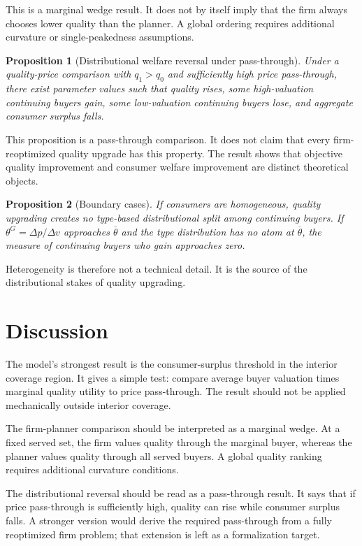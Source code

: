 \documentclass[12pt]{article}
\theoremstyle{plain}
\newtheorem{proposition}{Proposition}
\theoremstyle{definition}
\theoremstyle{remark}
\begin{document}
This is a marginal wedge result. It does not by itself imply that the firm always chooses lower quality than the planner. A global ordering requires additional curvature or single-peakedness assumptions.

\begin{proposition}[Distributional welfare reversal under pass-through]
Under a quality-price comparison with $q_1>q_0$ and sufficiently high price pass-through, there exist parameter values such that quality rises, some high-valuation continuing buyers gain, some low-valuation continuing buyers lose, and aggregate consumer surplus falls.
\end{proposition}

This proposition is a pass-through comparison. It does not claim that every firm-reoptimized quality upgrade has this property. The result shows that objective quality improvement and consumer welfare improvement are distinct theoretical objects.

\begin{proposition}[Boundary cases]
If consumers are homogeneous, quality upgrading creates no type-based distributional split among continuing buyers. If $\theta^G=\Delta p/\Delta v$ approaches $\overline\theta$ and the type distribution has no atom at $\overline\theta$, the measure of continuing buyers who gain approaches zero.
\end{proposition}

Heterogeneity is therefore not a technical detail. It is the source of the distributional stakes of quality upgrading.

\section{Discussion}

The model's strongest result is the consumer-surplus threshold in the interior coverage region. It gives a simple test: compare average buyer valuation times marginal quality utility to price pass-through. The result should not be applied mechanically outside interior coverage.

The firm-planner comparison should be interpreted as a marginal wedge. At a fixed served set, the firm values quality through the marginal buyer, whereas the planner values quality through all served buyers. A global quality ranking requires additional curvature conditions.

The distributional reversal should be read as a pass-through result. It says that if price pass-through is sufficiently high, quality can rise while consumer surplus falls. A stronger version would derive the required pass-through from a fully reoptimized firm problem; that extension is left as a formalization target.
\end{document}
